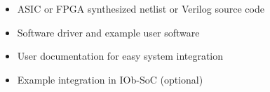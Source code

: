 \begin{itemize}
	\item ASIC or FPGA synthesized netlist or Verilog source code
	\item Software driver and example user software
	\item User documentation for easy system integration
	\item Example integration in IOb-SoC (optional)
\end{itemize}
